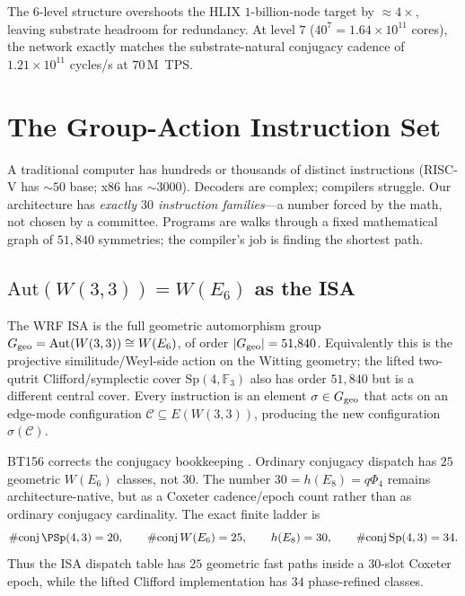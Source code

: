 \documentclass[11pt,letterpaper]{article}
\theoremstyle{remark}
\newcommand{\W}{W(3,3)}
\newcommand{\Sp}{\mathrm{Sp}}
\newcommand{\Aut}{\mathrm{Aut}}
\newcommand{\FF}{\mathbb{F}}
\begin{document}
The $6$-level structure overshoots the HLIX $1$-billion-node target by $\approx 4\times$,
leaving substrate headroom for redundancy. At level $7$ ($40^7 = 1.64 \times 10^{11}$
cores), the network exactly matches the substrate-natural conjugacy cadence of
$1.21\times 10^{11}$ cycles/s at $70$\,M~TPS.

\section{The Group-Action Instruction Set}\label{sec:isa}

\begin{plainenglish}
A traditional computer has hundreds or thousands of distinct instructions (RISC-V has
${\sim}50$ base; x86 has ${\sim}3000$). Decoders are complex; compilers struggle. Our
architecture has \emph{exactly $30$ instruction families}---a number forced by the math,
not chosen by a committee. Programs are walks through a fixed mathematical graph of
$51{,}840$ symmetries; the compiler's job is finding the shortest path.
\end{plainenglish}

\subsection{\texorpdfstring{$\Aut(\W) = W(E_6)$ as the ISA}{Aut(W(3,3)) = W(E6) as the ISA}}

The WRF ISA is the full geometric automorphism group
$G_{\rm geo} = \Aut(\W) \cong W(E_6)$, of order $|G_{\rm geo}| = 51{,}840$.
Equivalently this is the projective similitude/Weyl-side action on the Witting geometry;
the lifted two-qutrit Clifford/symplectic cover $\Sp(4,\FF_3)$ also has order
$51{,}840$ but is a different central cover. Every instruction is an element
$\sigma \in G_{\rm geo}$ that acts on an
edge-mode configuration $\mathcal{C} \subseteq E(\W)$, producing the new configuration
$\sigma(\mathcal{C})$.

BT156 corrects the conjugacy bookkeeping \cite{wrf-bt156}. Ordinary conjugacy dispatch
has $25$ geometric $W(E_6)$ classes, not $30$. The number
$30 = h(E_8) = q\Phi_4$ remains architecture-native, but as a Coxeter cadence/epoch
count rather than as ordinary conjugacy cardinality. The exact finite ladder is
\[
\#\mathrm{conj}\,\PSp(4,3)=20,\qquad
\#\mathrm{conj}\,W(E_6)=25,\qquad
h(E_8)=30,\qquad
\#\mathrm{conj}\,\Sp(4,3)=34.
\]
Thus the ISA dispatch table has $25$ geometric fast paths inside a $30$-slot Coxeter
epoch, while the lifted Clifford implementation has $34$ phase-refined classes.
\end{document}
